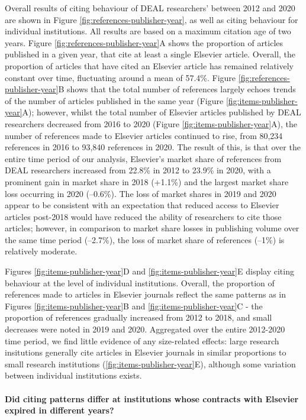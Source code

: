 \documentclass[
]{article}
\begin{document}
Overall results of citing behaviour of DEAL researchers' between 2012 and 2020 are shown in Figure \ref{fig:references-publisher-year}, as well as citing behaviour for individual institutions. All results are based on a maximum citation age of two years. Figure \ref{fig:references-publisher-year}A shows the proportion of articles published in a given year, that cite at least a single Elsevier article. Overall, the proportion of articles that have cited an Elsevier article has remained relatively constant over time, fluctuating around a mean of 57.4\%. Figure \ref{fig:references-publisher-year}B shows that the total number of references largely echoes trends of the number of articles published in the same year (Figure \ref{fig:items-publisher-year}A); however, whilst the total number of Elsevier articles published by DEAL researchers decreased from 2016 to 2020 (Figure \ref{fig:items-publisher-year}A), the number of references made to Elsevier articles continued to rise, from 80,234 references in 2016 to 93,840 references in 2020. The result of this, is that over the entire time period of our analysis, Elsevier's market share of references from DEAL researchers increased from 22.8\% in 2012 to 23.9\% in 2020, with a prominent gain in market share in 2018 (+1.1\%) and the largest market share loss occurring in 2020 (--0.6\%). The loss of market shares in 2019 and 2020 appear to be consistent with an expectation that reduced access to Elsevier articles post-2018 would have reduced the ability of researchers to cite those articles; however, in comparison to market share losses in publishing volume over the same time period (--2.7\%), the loss of market share of references (--1\%) is relatively moderate.

Figures \ref{fig:items-publisher-year}D and \ref{fig:items-publisher-year}E display citing behaviour at the level of individual institutions. Overall, the proportion of references made to articles in Elsevier journals reflect the same patterns as in Figures \ref{fig:items-publisher-year}B and \ref{fig:items-publisher-year}C - the proportion of references gradually increased from 2012 to 2018, and small decreases were noted in 2019 and 2020. Aggregated over the entire 2012-2020 time period, we find little evidence of any size-related effects: large research insitutions generally cite articles in Elsevier journals in similar proportions to small research institutions (\ref{fig:items-publisher-year}E), although some variation between individual institutions exists.

\hypertarget{did-citing-patterns-differ-at-institutions-whose-contracts-with-elsevier-expired-in-different-years}{%
\paragraph{Did citing patterns differ at institutions whose contracts with Elsevier expired in different years?}\label{did-citing-patterns-differ-at-institutions-whose-contracts-with-elsevier-expired-in-different-years}}
\end{document}
